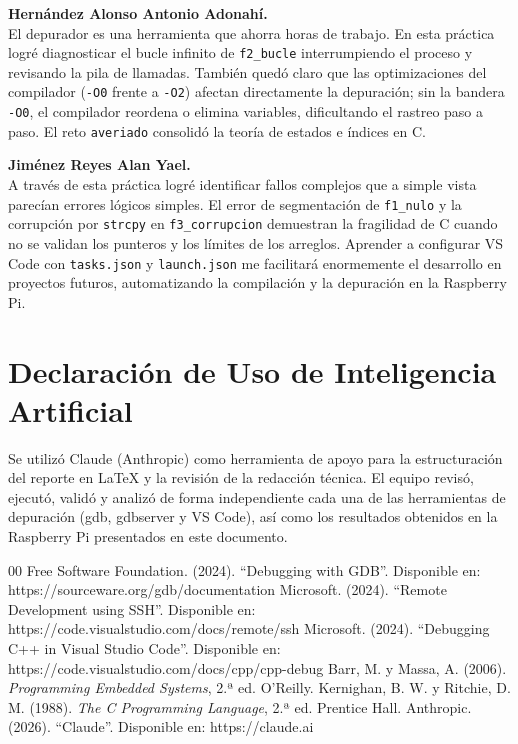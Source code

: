 \documentclass[conference]{IEEEtran}
\begin{document}
\textbf{Hernández Alonso Antonio Adonahí.} \\
El depurador es una herramienta que ahorra horas de trabajo. En esta práctica logré diagnosticar el bucle infinito de \texttt{f2\_bucle} interrumpiendo el proceso y revisando la pila de llamadas. También quedó claro que las optimizaciones del compilador (\texttt{-O0} frente a \texttt{-O2}) afectan directamente la depuración; sin la bandera \texttt{-O0}, el compilador reordena o elimina variables, dificultando el rastreo paso a paso. El reto \texttt{averiado} consolidó la teoría de estados e índices en C.

\textbf{Jiménez Reyes Alan Yael.} \\
A través de esta práctica logré identificar fallos complejos que a simple vista parecían errores lógicos simples. El error de segmentación de \texttt{f1\_nulo} y la corrupción por \texttt{strcpy} en \texttt{f3\_corrupcion} demuestran la fragilidad de C cuando no se validan los punteros y los límites de los arreglos. Aprender a configurar VS Code con \texttt{tasks.json} y \texttt{launch.json} me facilitará enormemente el desarrollo en proyectos futuros, automatizando la compilación y la depuración en la Raspberry Pi.

\section*{Declaración de Uso de Inteligencia Artificial}
Se utilizó Claude (Anthropic) como herramienta de apoyo para la estructuración del reporte en LaTeX y la revisión de la redacción técnica. El equipo revisó, ejecutó, validó y analizó de forma independiente cada una de las herramientas de depuración (gdb, gdbserver y VS Code), así como los resultados obtenidos en la Raspberry Pi presentados en este documento.

\begin{thebibliography}{00}
	 Free Software Foundation. (2024). ``Debugging with GDB''. Disponible en: https://sourceware.org/gdb/documentation
	 Microsoft. (2024). ``Remote Development using SSH''. Disponible en: https://code.visualstudio.com/docs/remote/ssh
	 Microsoft. (2024). ``Debugging C++ in Visual Studio Code''. Disponible en: https://code.visualstudio.com/docs/cpp/cpp-debug
	 Barr, M. y Massa, A. (2006). \textit{Programming Embedded Systems}, 2.ª ed. O'Reilly.
	 Kernighan, B. W. y Ritchie, D. M. (1988). \textit{The C Programming Language}, 2.ª ed. Prentice Hall.
     Anthropic. (2026). ``Claude''. Disponible en: https://claude.ai
\end{thebibliography}
\end{document}
